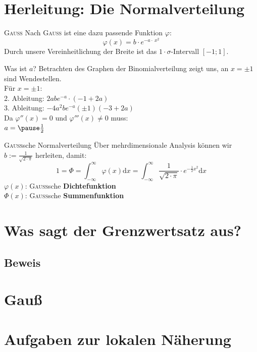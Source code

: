 \documentclass[14pt]{beamer}
\begin{document}
\section{Herleitung: Die Normalverteilung}
\begin{frame}{\textrm{\textsc{Gauß}}}
Nach \textrm{\textsc{Gauß}} ist eine dazu passende Funktion $\varphi$:
$$
\varphi(x)=b\cdot e^{-a\cdot\ x^2}
$$
Durch unsere Vereinheitlichung der Breite ist das $1\cdot \sigma$-Intervall $[-1;1]$.
\end{frame}


\begin{frame}{Was ist $a$?}
Betrachten des Graphen der Binomialverteilung zeigt uns, an $x=\pm 1$ sind Wendestellen.\\
Für $x=\pm 1$:\\
2. Ableitung: $2abe^{-a} \cdot (-1+2 a)$\\
3. Ableitung: $-4 a^{2} b e^{-a} (\pm1) (-3+2 a)$\\

Da $\varphi''(x)=0$ und $\varphi'''(x)\neq0$ muss:\\
$a=\pause\frac{1}{2}$
\end{frame}


\begin{frame}{\textrm{\textsc{Gauß}}sche Normalverteilung}
Über mehrdimensionale Analysis können wir $b:=\frac{1}{\sqrt{2\cdot \pi}}$ herleiten, damit:
$$
1= \Phi =  \int^{\infty}_{-\infty} \varphi(x) {\mathrm d}x = \int^{\infty}_{-\infty} \frac{1}{\sqrt{2\cdot \pi}} \cdot e^{-\frac{1}{2}x^2} {\mathrm d}x
$$
$\varphi(x)$: \textrm{\textsc{Gauß}}sche \textbf{Dichtefunktion}\\
$\Phi(x)$:  \textrm{\textsc{Gauß}}sche \textbf{Summenfunktion}
\end{frame}



\section{Was sagt der Grenzwertsatz aus?} %
\subsection{Beweis} %
\section{Gauß} %
\section{Aufgaben zur lokalen Näherung}
\end{document}
